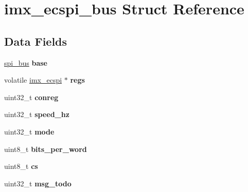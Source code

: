 \hypertarget{structimx__ecspi__bus}{}\section{imx\+\_\+ecspi\+\_\+bus Struct Reference}
\label{structimx__ecspi__bus}
\subsection*{Data Fields}
\begin{DoxyCompactItemize}
\item 
\mbox{\label{structimx__ecspi__bus_a1bbf64342ec7a9925e92b057f1b2f8c1}} 
\mbox{\hyperlink{structspi__bus}{spi\+\_\+bus}} {\bfseries base}
\item 
\mbox{\label{structimx__ecspi__bus_a3d3024933ab40422c619ccae1b810aaa}} 
volatile \mbox{\hyperlink{structimx__ecspi}{imx\+\_\+ecspi}} $\ast$ {\bfseries regs}
\item 
\mbox{\label{structimx__ecspi__bus_ad2d45634172b3ef951367e23deff18da}} 
uint32\+\_\+t {\bfseries conreg}
\item 
\mbox{\label{structimx__ecspi__bus_a74ca63adcaa5e8731c668fdb66789d43}} 
uint32\+\_\+t {\bfseries speed\+\_\+hz}
\item 
\mbox{\label{structimx__ecspi__bus_a96825358283f686e70a903cba32a07ee}} 
uint32\+\_\+t {\bfseries mode}
\item 
\mbox{\label{structimx__ecspi__bus_aa86a8f68ba5293c5ffdb17bc156d68c6}} 
uint8\+\_\+t {\bfseries bits\+\_\+per\+\_\+word}
\item 
\mbox{\label{structimx__ecspi__bus_a688e6a7442b8f8c8eb8ff17ab79ab350}} 
uint8\+\_\+t {\bfseries cs}
\item 
\mbox{\label{structimx__ecspi__bus_ad8efb25424726c78d758d913f0c8c0e1}} 
uint32\+\_\+t {\bfseries msg\+\_\+todo}
\item 
\mbox{\label{structimx__ecspi__bus_ae65c75ffabba0c2ffa2e42754f91e3af}} 

\end{DoxyCompactItemize}
